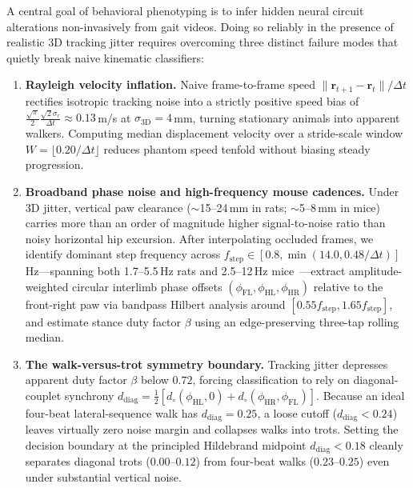 \documentclass[10pt,twocolumn,letterpaper]{article}
\begin{document}
A central goal of behavioral phenotyping is to infer hidden neural circuit alterations non-invasively from gait videos. Doing so reliably in the presence of realistic 3D tracking jitter requires overcoming three distinct failure modes that quietly break naive kinematic classifiers:

\begin{enumerate}[leftmargin=*,itemsep=1.4pt,topsep=2pt]
  \item \textbf{Rayleigh velocity inflation.} Naive frame-to-frame speed $\|\mathbf{r}_{t+1}-\mathbf{r}_t\|/\Delta t$ rectifies isotropic tracking noise into a strictly positive speed bias of $\frac{\sqrt{\pi}}{2}\frac{\sqrt{2}\sigma_r}{\Delta t} \approx 0.13$\,m/s at $\sigma_{\mathrm{3D}}=4$\,mm, turning stationary animals into apparent walkers. Computing median displacement velocity over a stride-scale window $W = \lfloor 0.20/\Delta t \rfloor$ reduces phantom speed tenfold without biasing steady progression.
  \item \textbf{Broadband phase noise and high-frequency mouse cadences.} Under 3D jitter, vertical paw clearance ($\sim$15--24\,mm in rats; $\sim$5--8\,mm in mice) carries more than an order of magnitude higher signal-to-noise ratio than noisy horizontal hip excursion. After interpolating occluded frames, we identify dominant step frequency across $f_{\mathrm{step}} \in [0.8, \min(14.0, 0.48/\Delta t)]$\,Hz---spanning both 1.7--5.5\,Hz rats and 2.5--12\,Hz mice~\cite{bellardita2015v0}---extract amplitude-weighted circular interlimb phase offsets $(\phi_{\mathrm{FL}}, \phi_{\mathrm{HL}}, \phi_{\mathrm{HR}})$ relative to the front-right paw via bandpass Hilbert analysis around $[0.55 f_{\mathrm{step}}, 1.65 f_{\mathrm{step}}]$, and estimate stance duty factor $\beta$ using an edge-preserving three-tap rolling median.
  \item \textbf{The walk-versus-trot symmetry boundary.} Tracking jitter depresses apparent duty factor $\beta$ below $0.72$, forcing classification to rely on diagonal-couplet synchrony $d_{\mathrm{diag}} = \tfrac{1}{2}[d_\circ(\phi_{\mathrm{HL}}, 0) + d_\circ(\phi_{\mathrm{HR}}, \phi_{\mathrm{FL}})]$. Because an ideal four-beat lateral-sequence walk has $d_{\mathrm{diag}} = 0.25$, a loose cutoff ($d_{\mathrm{diag}} < 0.24$) leaves virtually zero noise margin and collapses walks into trots. Setting the decision boundary at the principled Hildebrand midpoint $d_{\mathrm{diag}} < 0.18$ cleanly separates diagonal trots ($0.00\text{--}0.12$) from four-beat walks ($0.23\text{--}0.25$) even under substantial vertical noise.
\end{enumerate}
\end{document}
